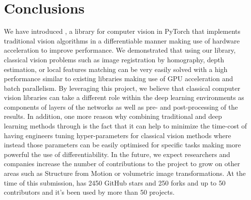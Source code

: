 \section{Conclusions}
We have introduced \lib, a library for computer vision in PyTorch that implements traditional vision algorithms in a differentiable manner making use of hardware acceleration to improve performance. We demonstrated that using our library, classical vision problems such as image registration by homography, depth estimation, or local features matching can be very easily solved with a high performance similar to existing libraries making use of GPU acceleration and batch parallelism. By leveraging this project, we believe that classical computer vision libraries can take a different role within the deep learning environments as components of layers of the networks as well as pre- and post-processing of the results. In addition, one more reason why combining traditional and deep learning methods through \lib{} is the fact that it can help to minimize the time-cost of having engineers tuning hyper-parameters for classical vision methods where instead those parameters can be easily optimised for specific tasks making more powerful the use of differentiability. In the future, we expect researchers and companies increase the number of contributions to the project to grow on other areas such as Structure from Motion or volumetric image transformations. At the time of this submission, \lib{} has 2450 GitHub stars and 250 forks and up to 50 contributors and it's been used by more than 50 projects.